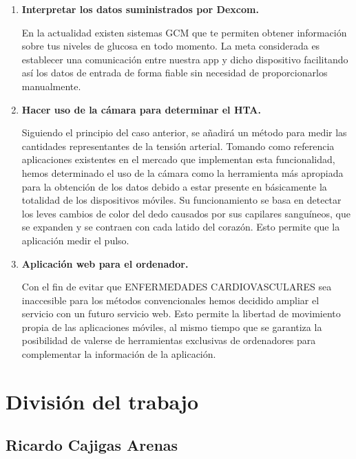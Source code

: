 \documentclass[11pt,spanish,
		listoftables,listoffigures]
		{tfgplantilla}
\begin{document}
\begin{enumerate}
	\item \textbf {Interpretar los datos suministrados por Dexcom.}

En la actualidad existen sistemas GCM que te permiten obtener información sobre tus niveles de glucosa en todo momento. La meta considerada es establecer una comunicación entre nuestra app y dicho dispositivo facilitando así los datos de entrada de forma fiable sin necesidad de proporcionarlos manualmente.

	\item \textbf {Hacer uso de la cámara para determinar el HTA.} 

Siguiendo el principio del caso anterior, se añadirá un método para medir las cantidades representantes de la tensión arterial. Tomando como referencia aplicaciones existentes en el mercado que implementan esta funcionalidad, hemos determinado el uso de la cámara como la herramienta más apropiada para la obtención de los datos debido a estar presente en básicamente la totalidad de los dispositivos móviles. Su funcionamiento se basa en detectar los leves cambios de color del dedo causados por sus capilares sanguíneos, que se expanden y se contraen con cada latido del corazón. Esto permite que la aplicación medir el pulso.

	\item \textbf {Aplicación web para el ordenador.}

Con el fin de evitar que \MakeUppercase{Enfermedades Cardiovasculares} sea inaccesible para los métodos convencionales hemos decidido ampliar el servicio con un futuro servicio web. Esto permite la libertad de movimiento propia de las aplicaciones móviles, al mismo tiempo que se garantiza la posibilidad de valerse de herramientas exclusivas de ordenadores para complementar la información de la aplicación.
\end{enumerate}

\chapter{División del trabajo}

\section{Ricardo Cajigas Arenas}
\end{document}

